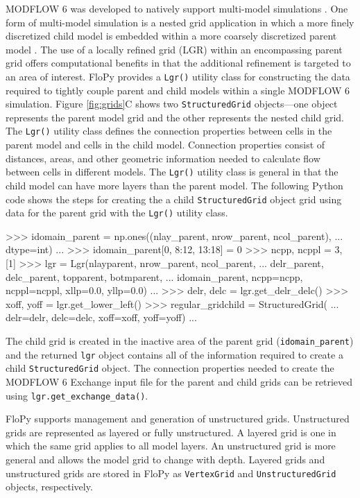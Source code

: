\documentclass[12pt, oneside]{article}  	%
\begin{document}
MODFLOW 6 was developed to natively support multi-model simulations \citep{modflow6framework}. One form of multi-model simulation is a nested grid application in which a more finely discretized child model is embedded within a more coarsely discretized parent model \citep{modflowlgr, vilhelmsen2012evaluation, modflowlgr2}. The use of a locally refined grid (LGR) within an encompassing parent grid offers computational benefits in that the additional refinement is targeted to an area of interest. FloPy provides a \texttt{Lgr()} utility class for constructing the data required to tightly couple parent and child models within a single MODFLOW 6 simulation. Figure \ref{fig:grids}C shows two \texttt{StructuredGrid} objects---one object represents the parent model grid and the other represents the nested child grid. The \texttt{Lgr()} utility class defines the connection properties between cells in the parent model and cells in the child model. Connection properties consist of distances, areas, and other geometric information needed to calculate flow between cells in different models. The \texttt{Lgr()} utility class is general in that the child model can have more layers than the parent model. The following Python code shows the steps for creating the a child \texttt{StructuredGrid} object grid using data for the parent grid with the \texttt{Lgr()} utility class.

\begin{python}
>>> idomain_parent = np.ones((nlay_parent, nrow_parent, ncol_parent), 
... dtype=int)
...
>>> idomain_parent[0, 8:12, 13:18] = 0
>>> ncpp, ncppl = 3, [1]
>>> lgr = Lgr(nlayparent, nrow_parent, ncol_parent,
... delr_parent, delc_parent, topparent, botmparent,
... idomain_parent, ncpp=ncpp, ncppl=ncppl, xllp=0.0, yllp=0.0)
...
>>> delr, delc = lgr.get_delr_delc()
>>> xoff, yoff = lgr.get_lower_left()
>>> regular_gridchild = StructuredGrid(
... delr=delr, delc=delc, xoff=xoff, yoff=yoff)
...
\end{python}

\noindent The child grid is created in the inactive area of the parent grid (\texttt{idomain\_parent}) and the returned \texttt{lgr} object contains all of the information required to create a child \texttt{StructuredGrid} object. The connection properties needed to create the MODFLOW 6 Exchange input file for the parent and child grids can be retrieved using \texttt{lgr.get\_exchange\_data()}.

FloPy supports management and generation of unstructured grids. Unstructured grids are represented as layered or fully unstructured. A layered grid is one in which the same grid applies to all model layers. An unstructured grid is more general and allows the model grid to change with depth. Layered grids and unstructured grids are stored in FloPy as \texttt{VertexGrid} and \texttt{UnstructuredGrid} objects, respectively.
\end{document}
